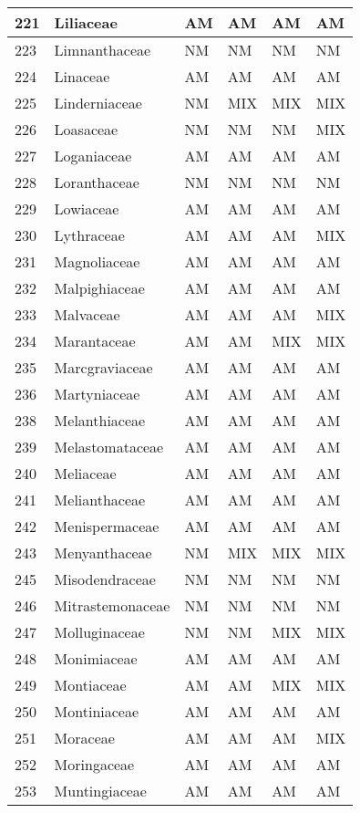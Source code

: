 \documentclass[]{article}
\begin{document}
\begin{longtable}{l|l|l|l|l|l}
\hline
221 & Liliaceae & AM & AM & AM & AM\\
\hline
223 & Limnanthaceae & NM & NM & NM & NM\\
\hline
224 & Linaceae & AM & AM & AM & AM\\
\hline
225 & Linderniaceae & NM & MIX & MIX & MIX\\
\hline
226 & Loasaceae & NM & NM & NM & MIX\\
\hline
227 & Loganiaceae & AM & AM & AM & AM\\
\hline
228 & Loranthaceae & NM & NM & NM & NM\\
\hline
229 & Lowiaceae & AM & AM & AM & AM\\
\hline
230 & Lythraceae & AM & AM & AM & MIX\\
\hline
231 & Magnoliaceae & AM & AM & AM & AM\\
\hline
232 & Malpighiaceae & AM & AM & AM & AM\\
\hline
233 & Malvaceae & AM & AM & AM & MIX\\
\hline
234 & Marantaceae & AM & AM & MIX & MIX\\
\hline
235 & Marcgraviaceae & AM & AM & AM & AM\\
\hline
236 & Martyniaceae & AM & AM & AM & AM\\
\hline
238 & Melanthiaceae & AM & AM & AM & AM\\
\hline
239 & Melastomataceae & AM & AM & AM & AM\\
\hline
240 & Meliaceae & AM & AM & AM & AM\\
\hline
241 & Melianthaceae & AM & AM & AM & AM\\
\hline
242 & Menispermaceae & AM & AM & AM & AM\\
\hline
243 & Menyanthaceae & NM & MIX & MIX & MIX\\
\hline
245 & Misodendraceae & NM & NM & NM & NM\\
\hline
246 & Mitrastemonaceae & NM & NM & NM & NM\\
\hline
247 & Molluginaceae & NM & NM & MIX & MIX\\
\hline
248 & Monimiaceae & AM & AM & AM & AM\\
\hline
249 & Montiaceae & AM & AM & MIX & MIX\\
\hline
250 & Montiniaceae & AM & AM & AM & AM\\
\hline
251 & Moraceae & AM & AM & AM & MIX\\
\hline
252 & Moringaceae & AM & AM & AM & AM\\
\hline
253 & Muntingiaceae & AM & AM & AM & AM\\

\end{longtable}
\end{document}
